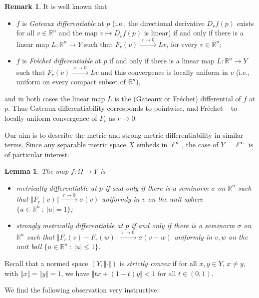 \documentclass[12pt,leqno]{amsart}
\newtheorem{lemma}[theorem]{Lemma}
\theoremstyle{definition}
\newtheorem{remark}[theorem]{Remark}
\newcommand{\bbbr}{\mathbb R}
\numberwithin{theorem}{section} \numberwithin{equation}{section}
\begin{document}
\begin{remark}
\label{rem:md1}
It is well known that
\begin{itemize}
    \item[a)] $f$ is \emph{Gateaux differentiable} at $p$ (i.e., the directional derivative $D_vf(p)$ exists for all $v\in \bbbr^n$ and the map $v\mapsto D_vf(p)$ is linear) if and only if there is a linear map $L:\bbbr^n\to Y$ such that $F_r(v)\xrightarrow{~~r\to 0~~}Lv$, for every $v\in\bbbr^n$;
    \item[b)] $f$ is \emph{Fr\'echet differentiable} at $p$ if and only if there is a linear map $L:\bbbr^n\to Y$ such that $F_r(v)\xrightarrow{~~r\to 0~~}Lv$ and this convergence is locally uniform in $v$ (i.e., uniform on every compact subset of $\bbbr^n$),
\end{itemize}
and in both cases the linear map $L$ is the (Gateaux or Fr\'echet) differential of $f$ at $p$. Thus Gateaux differentiability corresponds to pointwise, and Fr\'echet -- to locally uniform convergence of $F_r$ as $r\to 0$.
\end{remark}
Our aim is to describe the metric and strong metric differentiability in similar terms. Since any separable metric space $X$ embeds in $\ell^\infty$, the case of $Y=\ell^\infty$ is of particular interest.
\begin{lemma}\label{lem:md l1.2}
 The map $f:\Omega\to Y$ is
\begin{itemize}
\item[a)]  \emph{metrically differentiable} at $p$ if and only if there is a seminorm $\sigma$ on $\bbbr^n$ such that $\Vert F_r(v)\Vert\xrightarrow{~~r\to 0~~}\sigma(v)$  uniformly in $v$ on the unit sphere $\{u\in\bbbr^n~:~|u|=1\}$;
\item[b)] \emph{strongly metrically differentiable} at $p$ if and only if  there is a seminorm $\sigma$ on $\bbbr^n$ such that $\Vert F_r(v)-F_r(w)\Vert\xrightarrow{~~r\to 0~~}\sigma(v-w)$ uniformly in $v,w$ on the unit ball $\{u\in\bbbr^n~:~|u|\leq 1\}$.
\end{itemize}
\end{lemma}


Recall that a normed space $(Y,\Vert\cdot\Vert)$ is {\em strictly convex} if for all $x,y\in Y$, $x\neq y$, with $\Vert x\Vert=\Vert y\Vert=1$, we have $\Vert tx+(1-t)y\Vert<1$ for all $t\in (0,1)$.

We find the following observation very instructive:
\end{document}
